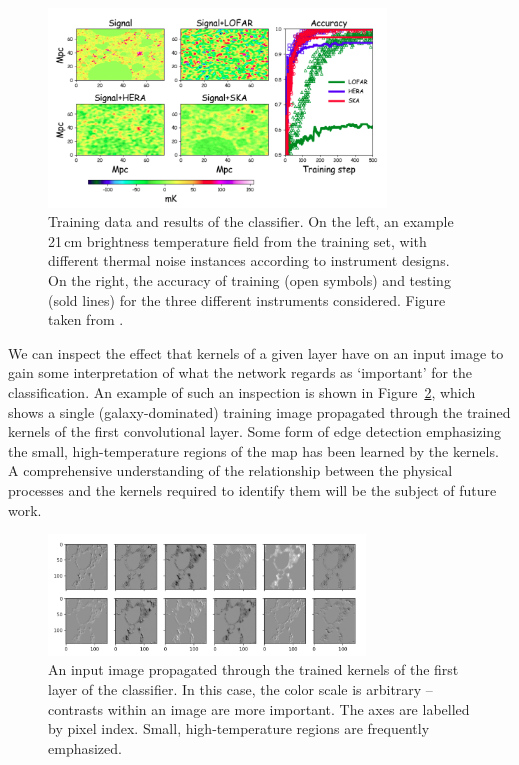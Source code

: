 \begin{figure}
\centering
\includegraphics[width=0.8\textwidth]{chapters/hera_ml/figures/hassan-results.png}
\caption[Training data and results of the classifier.]{Training data and results of the classifier. On the left, an example 21\,cm brightness temperature field from the training set, with different thermal noise instances according to instrument designs. On the right, the accuracy of training (open symbols) and testing (sold lines) for the three different instruments considered. Figure taken from \cite{Hassan.18}.}
\label{fig:hassan-results}
\end{figure}

We can inspect the effect that kernels of a given layer have on an input image to gain some interpretation of what the network regards as `important' for the classification. An example of such an inspection is shown in Figure~\ref{fig:CNN_kernel_images}, which shows a single (galaxy-dominated) training image propagated through the trained kernels of the first convolutional layer. Some form of edge detection emphasizing the small, high-temperature regions of the map has been learned by the kernels. A comprehensive understanding of the relationship between the physical processes and the kernels required to identify them will be the subject of future work.

\begin{figure}
\centering
\includegraphics[width=0.75\textwidth]{chapters/hera_ml/figures/classifier-kernels.png}
\caption[An input image propagated through the trained kernels of the first layer of the classifier.]{An input image propagated through the trained kernels of the first layer of the classifier. In this case, the color scale is arbitrary -- contrasts within an image are more important. The axes are labelled by pixel index. Small, high-temperature regions are frequently emphasized.}
\label{fig:CNN_kernel_images}
\end{figure}

